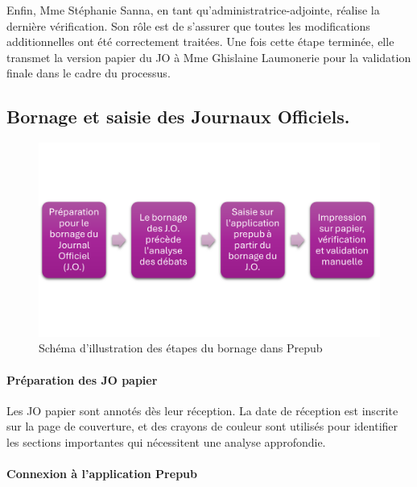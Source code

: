 Enfin, Mme Stéphanie Sanna, en tant qu’administratrice-adjointe, réalise la dernière vérification. Son rôle est de s'assurer que toutes les modifications additionnelles ont été correctement traitées. Une fois cette étape terminée, elle transmet la version papier du JO à Mme Ghislaine Laumonerie pour la validation finale dans le cadre du processus.

\subsection{Bornage et saisie des Journaux Officiels.}

\begin{figure}[H]
    \centering
    \includegraphics{images/Schéma Bornage Prepub.png}
    \caption{Schéma d'illustration des étapes du bornage dans Prepub}
\end{figure}

\paragraph{Préparation des JO papier}

Les JO papier sont annotés dès leur réception. La date de réception est inscrite sur la page de couverture, et des crayons de couleur sont utilisés pour identifier les sections importantes qui nécessitent une analyse approfondie.

\paragraph{Connexion à l'application Prepub}

